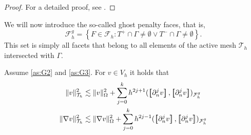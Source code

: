 \begin{proof}
    For a detailed proof, see \cite{gurkan2019stabilized}.
\end{proof}

We will now introduce the so-called ghost penalty faces, that is, \[
\mathcal{F} ^{g}_{h} = \left\{ F\in \mathcal{F} _{h} : T^{+}\cap \Gamma \neq \emptyset  \vee T^{-}\cap \Gamma \neq \emptyset  \right\}.
\]
This set is simply all facets that belong to all elements of the active mesh $\mathcal{T} _{h}$  intersected with $\Gamma $.

\begin{lemma}
    \label{lemma:inv_gh_lemma}
    Assume \ref{as:G2} and \ref{as:G3}.
    For $v \in  V_{h}$ it holds that
        \begin{align}
            \label{eq:inv_gh_1}
        \| v \|_{ \mathcal{T} _{h} }^{ 2 }  & \lesssim  \| v \|_{ \Omega  }^{ 2 }  + \sum_{j=0}^{k} h^{2j+1} ( \jump{ \partial ^{j}_{n} v }, \jump{ \partial ^{j}_{n} v}    )_{\mathcal{F}_{h}^{g}}\\
            \label{eq:inv_gh_2}
        \| \nabla v \|_{ \mathcal{T} _{h} }^{ 2 }  & \lesssim  \| \nabla v \|_{ \Omega  }^{ 2 }  + \sum_{j=0}^{k} h^{2j-1} ( \jump{ \partial ^{j}_{n} v }, \jump{ \partial ^{j}_{n}v }    )_{\mathcal{F}_{h}^{g}}
        \end{align}

\end{lemma}

